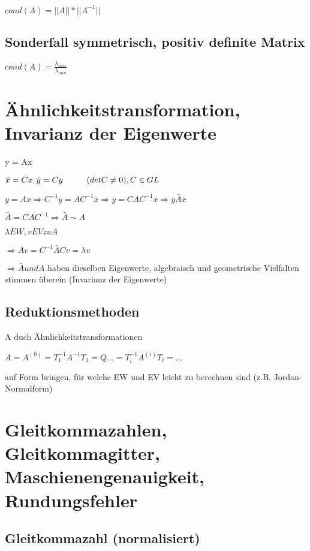\documentclass[12pt,a4paper]{article} %
\newcommand*\conj[1]{\bar{#1}}
\newcommand*\tab[1][1cm]{\hspace*{#1}}
\begin{document}
		$cond(A) = ||A||*||A^{-1}||$
		
		\subsection{Sonderfall symmetrisch, positiv definite Matrix}
		
		$cond(A) = \frac{ \lambda_{max}}{ \lambda_{min}}$
		
		\newpage
		
		\section{Ähnlichkeitstransformation, Invarianz der Eigenwerte}
		
		y = Ax
		
		$\conj{x} = Cx, \conj{y} = Cy \tab (det C \ne 0), C \in GL$ 
		
		$y = Ax \Rightarrow C^{-1} \conj{y} = AC^{-1} \conj{x} \Rightarrow \conj{y} = CAC^{-1} \conj{x} \Rightarrow \conj{y}\conj{A}\conj{x}$
		
		$\conj{A} = CAC^{-1} \Rightarrow \conj{A} \sim A$
		
		$\lambda EW, v EV zu A$
		
		$\Rightarrow Av = C^{-1}\conj{A}Cv = \lambda v$
		
		$\Rightarrow \conj{A} und A $ haben dieselben Eigenwerte, algebraisch und geometrische Vielfalten stimmen überein (Invarianz der Eigenwerte)
		
		\subsection{Reduktionsmethoden}
		
		A duch Ähnlichkeitstransformationen 
		
		$A = A^{(0)} = T_1^{-1} A^{-1}T_1 = Q ... = T_i^{-1}A^{(i)}T_i = ...$
		
		auf Form bringen, für welche EW und EV leicht zu berechnen sind (z.B. Jordan-Normalform)
		
		\newpage
		
		\section[Gleitkommazahlen]{Gleitkommazahlen, Gleitkommagitter, Maschienengenauigkeit, Rundungsfehler}
		
		\subsection{Gleitkommazahl (normalisiert)}
		
\end{document}
